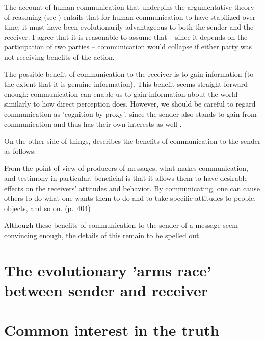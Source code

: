 The account of human communication that underpins the argumentative theory of reasoning (see \citet{Sperber01, Sperber10})
entails that for human communication to have stabilized over time, it must have been evolutionarily advantageous to both the sender and the receiver. I agree that it is reasonable to assume that -- since it depends on the participation of two parties -- communication would collapse if either party was not receiving benefits of the action.

The possible benefit of communication to the receiver is to gain information (to the extent that it is genuine information).
This benefit seems straight-forward enough: communication can enable us to gain information about the world similarly to how direct perception does. However, we should be careful to regard communication as 'cognition by proxy', since the sender also stands to gain from communication and thus has their own interests as well \citep{Sperber01}.

On the other side of things, \citet{Sperber01} describes the benefits of communication to the sender as follows:
\begin{quoting}
    From the point of view of producers of messages, what makes communication, and testimony in particular, beneficial is that it allows them to have desirable effects on the receivers' attitudes and behavior. By communicating, one can cause others to do what one wants them to do and to take specific attitudes to people, objects, and so on.
    \hfill (p.~404)
\end{quoting}
Although these benefits of communication to the sender of a message seem convincing enough, the details of this remain to be spelled out.

\section{The evolutionary 'arms race' between sender and receiver}

\section{Common interest in the truth}
